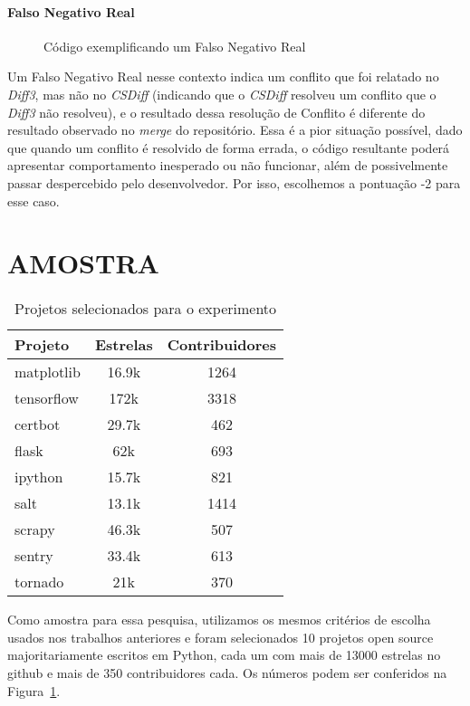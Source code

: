 \paragraph{Falso Negativo Real}
\begin{figure}[ht]
	\begin{center}
		
		\caption{Código exemplificando um Falso Negativo Real}\label{falso_negativo_real}
	\end{center}
\end{figure}

Um Falso Negativo Real nesse contexto indica um conflito que foi relatado no
\emph{Diff3}, mas não no \emph{CSDiff} (indicando que o \emph{CSDiff} resolveu
um conflito que o \emph{Diff3} não resolveu), e o resultado dessa resolução de
Conflito é diferente do resultado observado no \emph{merge} do repositório.
Essa é a pior situação possível, dado que quando um conflito é resolvido de
forma errada, o código resultante poderá apresentar comportamento inesperado ou
não funcionar, além de possivelmente passar despercebido pelo desenvolvedor.
Por isso, escolhemos a pontuação -2 para esse caso.

\section{AMOSTRA}

\begin{table}[ht]
	\begin{center}
		\begin{tabular}{|l|c|c|}
			\hline
			\textbf{Projeto} & \textbf{Estrelas} & \textbf{Contribuidores} \\
			\hline
			matplotlib       & 16.9k             & 1264                    \\
			tensorflow       & 172k              & 3318                    \\
			certbot          & 29.7k             & 462                     \\
			flask            & 62k               & 693                     \\
			ipython          & 15.7k             & 821                     \\
			salt             & 13.1k             & 1414                    \\
			scrapy           & 46.3k             & 507                     \\
			sentry           & 33.4k             & 613                     \\
			tornado          & 21k               & 370                     \\
			\hline
		\end{tabular}
	\end{center}
	\caption{Projetos selecionados para o experimento}\label{tabela_projeto}
\end{table}
Como amostra para essa pesquisa, utilizamos os mesmos critérios de escolha
usados nos trabalhos anteriores e foram selecionados 10 projetos open source
majoritariamente escritos em Python, cada um com mais de 13000 estrelas no
github e mais de 350 contribuidores cada. Os números podem ser conferidos na
Figura~\ref{tabela_projeto}.

